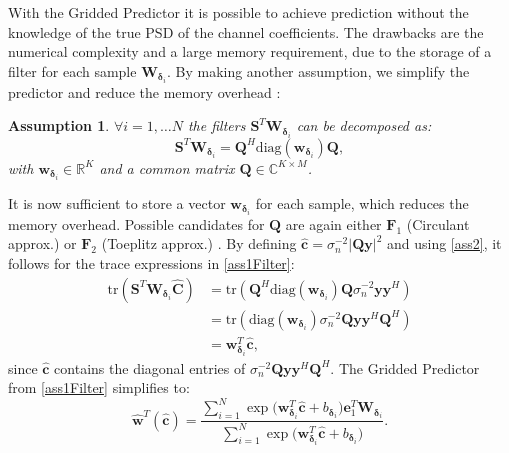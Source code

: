 \documentclass[12pt, draftclsnofoot, onecolumn]{IEEEtran}
\newtheorem{assumption}{Assumption}
\begin{document}
With the Gridded Predictor it is possible to achieve prediction without the knowledge of the true PSD of the channel coefficients. The drawbacks are the numerical complexity and a large memory requirement, due to the storage of a filter for each sample ${\mathbf{W}}_{\boldsymbol{\delta}_i}$. By making another assumption, we simplify the predictor and reduce the memory overhead \cite{turan2019learning}:
\begin{assumption}
$\forall i = 1,\dots N$ the filters $\mathbf{S}^T {\mathbf{W}}_{\boldsymbol{\delta}_i}$ can be decomposed as:
\begin{equation}
\mathbf{S}^T {\mathbf{W}}_{\boldsymbol{\delta}_i} = \mathbf{Q}^H \mathrm{diag}(\mathbf{w}_{\boldsymbol{\delta}_i}) \mathbf{Q},
\label{ass2}
\end{equation}
with $ \mathbf{w}_{\boldsymbol{\delta}_i} \in \mathbb{R}^K$ and a common matrix $\mathbf{Q} \in \mathbb{C}^{K \times M}$.
\end{assumption}
It is now sufficient to store a vector $\mathbf{w}_{\boldsymbol{\delta}_i}$ for each sample, which reduces the memory overhead. Possible candidates for $\mathbf{Q}$ are again either $\mathbf{F}_1$ (Circulant approx.) or $\mathbf{F}_2$ (Toeplitz approx.) \cite{Neumann, Gray2006}. By defining $\hat{\mathbf{c}} = {\sigma^{-2}_n} |\mathbf{Qy}|^2$ and using \eqref{ass2}, it follows for the trace expressions in \eqref{ass1Filter}:
\begin{align}
    \mathrm{tr}( \mathbf{S}^T {\mathbf{W}}_{\boldsymbol{\delta}_i} \hat{\mathbf{C}})
      &=  \mathrm{tr}( \mathbf{Q}^H \mathrm{diag}(\mathbf{w}_{\boldsymbol{\delta}_i}) \mathbf{Q} {\sigma^{-2}_n}\mathbf{y}\mathbf{y}^H) \\ 
      &= \mathrm{tr}( \mathrm{diag}(\mathbf{w}_{\boldsymbol{\delta}_i}) {\sigma^{-2}_n}\mathbf{Q} \mathbf{y}\mathbf{y}^H \mathbf{Q}^H ) \\
      &= \mathbf{w}^T_{\boldsymbol{\delta}_i} \hat{\mathbf{c}},
\end{align}
since $\hat{\mathbf{c}}$ contains the diagonal entries of ${\sigma^{-2}_n} \mathbf{Q} \mathbf{y}\mathbf{y}^H \mathbf{Q}^H$. 
The Gridded Predictor from \eqref{ass1Filter} simplifies to:
\begin{equation}
\hat{\mathbf{w}}^T(\hat{\mathbf{c}})  = \dfrac{ \sum_{i=1}^{N} \exp{(\mathbf{w}^T_{\boldsymbol{\delta}_i} \hat{\mathbf{c}}}+b_{\boldsymbol{\delta}_i}) \mathbf{e}_1^T {\mathbf{W}}_{\boldsymbol{\delta}_i}} { \sum_{i=1}^{N} \exp{( \mathbf{w}^T_{\boldsymbol{\delta}_i} \hat{\mathbf{c}}}+b_{\boldsymbol{\delta}_i})}.
\end{equation}
\end{document}
